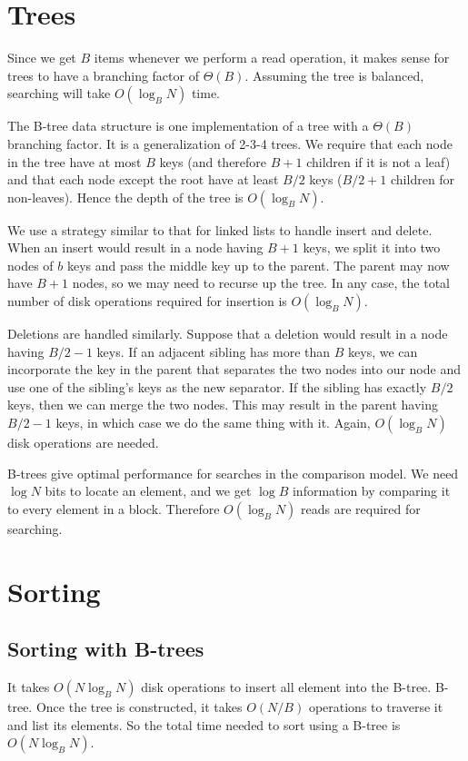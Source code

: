 \documentclass{article}
\begin{document}
\section{Trees}
Since we get $B$ items whenever we perform a read
operation, it makes sense for trees to have a branching
factor of $\Theta(B)$.  Assuming the tree is balanced, searching will take $O(\log_B N)$ time.

The B-tree data structure is one implementation of
a tree with a $\Theta(B)$ branching factor.  It is a
generalization of 2-3-4 trees.
We require that each node in the tree have at most
$B$ keys (and therefore $B+1$ children if it is not a leaf)
and that each node except the root have at least $B/2$
keys ($B/2+1$ children for non-leaves).  Hence the depth of
the tree is $O(\log_B N)$.

We use a strategy similar to that for linked lists to handle
insert and delete.  When an insert would
result in a node having $B+1$ keys, we split it into
two nodes of $b$ keys and pass the middle key up to the
parent.  The parent may now have $B+1$ nodes, so we
may need to recurse up the tree.  In any case, the
total number of disk operations required for insertion is
$O(\log_B N)$.

Deletions are handled similarly.  Suppose that a deletion would result in a node having $B/2-1$ keys.  If an adjacent sibling has more than $B$ keys, we can incorporate the key in the parent that separates the two nodes into our node and use one of the sibling's keys as the new separator.
If the sibling has exactly $B/2$ keys,
then we can merge the two nodes.  This may result in the parent having $B/2-1$ keys, in which case we do the same
thing with it.  Again, $O(\log_B N)$ disk operations are needed.

B-trees give optimal performance for searches in the comparison model.  We need $\log N$ bits to locate an element, and
we get $\log B$ information by comparing it to every
element in a block.  Therefore $O(\log_B N)$ reads
are required for searching.

\section{Sorting}
\subsection{Sorting with B-trees}
It takes $O(N \log_B N)$ disk operations to insert all
element into the B-tree.
B-tree.  Once the tree is constructed, it takes $O(N/B)$
operations to traverse it and list its elements.
So the total time needed to sort using a B-tree is
$O(N \log_B N)$.
\end{document}
